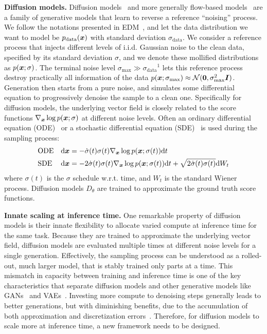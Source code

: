 \textbf{Diffusion models.} Diffusion models~\citep{sohl2015deep, ho2020denoising, song2021scorebased} and more generally flow-based models~\citep{albergo2023building, liu2023flow, lipman2023flow} are a family of generative models that learn to reverse a reference ``noising'' process. We follow the notations presented in EDM~\citep{karras2022elucidating}, and let the data distribution we want to model be $p_{\text{data}}(\boldsymbol{x})$ with standard deviation $\sigma_{\text{data}}$. We consider a reference process that injects different levels of i.i.d. Gaussian noise to the clean data, specified by its standard deviation $\sigma$, and we denote these mollified distributions as $p(\boldsymbol{x}; \sigma)$. The terminal noise level $\sigma_{\text{max}}\gg\sigma_{\text{data}}$$^1$
%
\thispagestyle{footnote1}
%
lets this reference process destroy practically all information of the data $p(\boldsymbol{x}; \sigma_{\text{max}})\approx \mathcal{N}(\boldsymbol{0}, \sigma_{\text{max}}^2\boldsymbol{I})$. Generation then starts from a pure noise, and simulates some differential equation to progressively denoise the sample to a clean one. Specifically for diffusion models, the underlying vector field is closely related to the score functions $\nabla_{\boldsymbol{x}}\log p(\boldsymbol{x};\sigma)$ at different noise levels. Often an ordinary differential equation (ODE)~\citep{song2021scorebased} or a stochastic differential equation (SDE)~\citep{anderson1982reverse} is used during the sampling process:
\begin{align*}
    &\text{ODE} &&\mathrm{d}\boldsymbol{x} = -\dot{\sigma}(t)\sigma(t)\nabla_{\boldsymbol{x}}\log p(\boldsymbol{x};\sigma(t))\mathrm{d}t \\
    &\text{SDE} &&\mathrm{d}\boldsymbol{x} = -2\dot{\sigma}(t)\sigma(t)\nabla_{\boldsymbol{x}}\log p(\boldsymbol{x};\sigma(t))\mathrm{d}t + \sqrt{2\dot{\sigma}(t)\sigma(t)} \mathrm{d}W_t
\end{align*}
where $\sigma(t)$ is the $\sigma$ schedule w.r.t. time, and $W_t$ is the standard Wiener process. Diffusion models $D_\theta$ are trained to approximate the ground truth score functions.


\textbf{Innate scaling at inference time.} One remarkable property of diffusion models is their innate flexibility to allocate varied compute at inference time for the same task. Because they are trained to approximate the underlying vector field, diffusion models are evaluated multiple times at different noise levels for a single generation. Effectively, the sampling process can be understood as a rolled-out, much larger model, that is stably trained only parts at a time. This mismatch in capacity between training and inference time is one of the key characteristics that separate diffusion models and other generative models like GANs~\citep{goodfellow2014generative} and VAEs~\citep{kingma2013auto}. Investing more compute to denoising steps generally leads to better generations, but with diminishing benefits, due to the accumulation of both approximation and discretization errors~\citep{xu2023restart}. Therefore, for diffusion models to scale more at inference time, a new framework needs to be designed.


